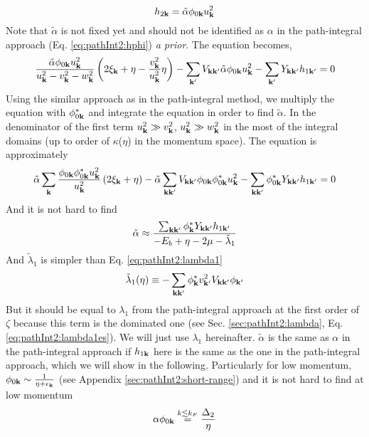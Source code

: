 \begin{equation}\label{eq:meanfield:h2phi}
h_{2\mathbf{k}}=\tilde\alpha{}\phi_{0\mathbf{k}}u_{\mathbf{k}}^{2}
\end{equation}
Note that $\tilde\alpha$ is not fixed yet and should not be identified as $\alpha$ in the path-integral approach (Eq. \ref{eq:pathInt2:hphi}) \textit{a prior}. The equation becomes,
\begin{equation*}
\frac{\tilde\alpha{}\phi_{0\mathbf{k}}u_{\mathbf{k}}^{2} }{u^{2}_{\mathbf{k}}-v_{\mathbf{k}}^{2}-w_{\mathbf{k}}^{2}}\left(2 \xi_{\mathbf{k}}+\eta-\frac{v_{\mathbf{k}}^{2}}{u_{\mathbf{k}}^{2}}\eta\right)-\sum_{\mathbf{k}'}V_{\mathbf{k}\mathbf{k}'}\tilde\alpha{}\phi_{0\mathbf{k}}u_{\mathbf{k}}^{2}-\sum_{\mathbf{k}'}Y_{\mathbf{k}\mathbf{k}'}h_{1\mathbf{k}'}=0
\end{equation*}
Using the similar approach as in the path-integral method, we multiply the equation with $\phi_{0\mathbf{k}}^{*}$ and integrate the equation in order to find $\tilde{\alpha}$. In the denominator of the first term $u^{2}_{\mathbf{k}}\gg{}v_{\mathbf{k}}^{2}$, $u^{2}_{\mathbf{k}}\gg{}w_{\mathbf{k}}^{2}$ in the most of the integral domains (up to order of $\kappa$($\eta$) in the momentum space).  The equation is approximately 
\begin{equation*}
\tilde\alpha{}\sum_{\mathbf{k}}\frac{\phi_{0\mathbf{k}}\phi_{0\mathbf{k}}^{*}u_{\mathbf{k}}^{2}}{u^{2}_{\mathbf{k}}}\left(2 \xi_{\mathbf{k}}+\eta\right)-\tilde\alpha\sum_{\mathbf{k}\mathbf{k}'}V_{\mathbf{k}\mathbf{k}'}{}\phi_{0\mathbf{k}}\phi_{0\mathbf{k}}^{*}u_{\mathbf{k}}^{2}-\sum_{\mathbf{k}\mathbf{k}'}\phi_{0\mathbf{k}}^{*}Y_{\mathbf{k}\mathbf{k}'}h_{1\mathbf{k}'}=0
\end{equation*}
And it is not hard to find 
\begin{equation}
\tilde\alpha\approx\frac{\sum_{\mathbf{k}\mathbf{k}'}{\phi_{\mathbf{k}}^{*}}{Y_{\mathbf{k}\mathbf{k}'}}{h_{1\mathbf{k}'}}}{{-E_{b}+\eta-2\mu-\tilde\lambda_{1}}}
\end{equation}
 And $\tilde\lambda_{1}$ is simpler than Eq. \ref{eq:pathInt2:lambda1}
\begin{equation*}
\tilde\lambda_{1}(\eta)\equiv-\sum_{\mathbf{k}\mathbf{k}'}{\phi_{\mathbf{k}}^{*}}{v_{\mathbf{k}'}^{2}V_{\mathbf{k}\mathbf{k}'}}\phi_{\mathbf{k}'}
\end{equation*}
But it should be equal to $\lambda_{1}$ from the path-integral approach at the first order of $\zeta$ because this term is the dominated one (see Sec. \ref{sec:pathInt2:lambda}, Eq. \ref{eq:pathInt2:lambda1es}). We will just use $\lambda_{1}$ hereinafter. $\tilde\alpha$ is the same as $\alpha$ in the path-integral approach if $h_{1\mathbf{k}}$ here is the same as the one in the path-integral approach,  which we will show in the following. Particularly for low momentum, $\phi_{0\mathbf{k}}\sim\frac{1}{\eta+\epsilon_{\mathbf{k}}}$ (see Appendix \ref{sec:pathInt2:short-range}) and it is not hard to find at low momentum
\begin{equation}\label{eq:meanfield:aphi}
\alpha\phi_{0\mathbf{k}}\overset{{k\lesssim{k_F}}}{=}\frac{\Delta_2}{\eta}
\end{equation}

